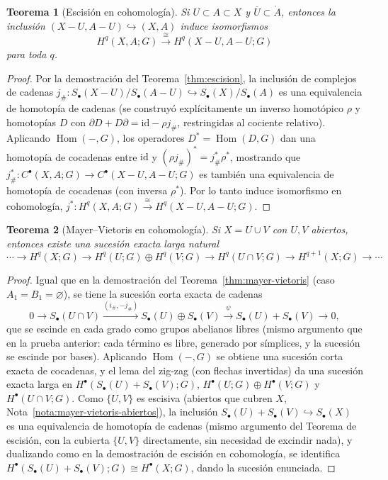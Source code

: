 \documentclass[11pt,a4paper]{article}
\theoremstyle{plain}
\newtheorem{theorem}{Teorema}[section]
\theoremstyle{definition}
\theoremstyle{remark}
\DeclareMathOperator{\Hom}{Hom}
\begin{document}
\begin{theorem}[Escisión en cohomología]
\label{thm:escision-cohomologia}
Si $U\subset A\subset X$ y $\overline U\subset\mathring A$, entonces la
inclusión $(X-U,A-U)\hookrightarrow(X,A)$ induce isomorfismos
\[
H^q(X,A;G)\xrightarrow{\cong}H^q(X-U,A-U;G)
\]
para toda $q$.
\end{theorem}

\begin{proof}
Por la demostración del Teorema~\ref{thm:escision}, la inclusión de
complejos de cadenas $j_\#:S_\bullet(X-U)/S_\bullet(A-U)\hookrightarrow S_\bullet(X)/S_\bullet(A)$
es una equivalencia de homotopía de cadenas (se construyó explícitamente
un inverso homotópico $\rho$ y homotopías $D$ con
$\partial D+D\partial=\mathrm{id}-\rho j_\#$, restringidas al cociente
relativo). Aplicando $\Hom(-,G)$, los operadores $D^*=\Hom(D,G)$ dan una
homotopía de cocadenas entre $\mathrm{id}$ y $(\rho j_\#)^*=j_\#^*\rho^*$,
mostrando que $j_\#^*:C^\bullet(X,A;G)\to C^\bullet(X-U,A-U;G)$ es
también una equivalencia de homotopía de cocadenas (con inversa
$\rho^*$). Por lo tanto induce isomorfismo en cohomología,
$j^*:H^q(X,A;G)\xrightarrow{\cong}H^q(X-U,A-U;G)$.
\end{proof}

\begin{theorem}[Mayer--Vietoris en cohomología]
\label{thm:mayer-vietoris-cohomologia}
Si $X=U\cup V$ con $U,V$ abiertos, entonces existe una sucesión exacta
larga natural
\[
\cdots\to H^q(X;G)\to H^q(U;G)\oplus H^q(V;G)\to H^q(U\cap V;G)\to H^{q+1}(X;G)\to\cdots
\]
\end{theorem}

\begin{proof}
Igual que en la demostración del Teorema~\ref{thm:mayer-vietoris} (caso
$A_1=B_1=\varnothing$), se tiene la sucesión corta exacta de cadenas
\[
0\to S_\bullet(U\cap V)\xrightarrow{(i_\#,-j_\#)}S_\bullet(U)\oplus S_\bullet(V)\xrightarrow{\psi}S_\bullet(U)+S_\bullet(V)\to0,
\]
que se escinde en cada grado como grupos abelianos libres (mismo
argumento que en la prueba anterior: cada término es libre, generado por
símplices, y la sucesión se escinde por bases). Aplicando $\Hom(-,G)$ se
obtiene una sucesión corta exacta de cocadenas, y el lema del zig-zag
(con flechas invertidas) da una sucesión exacta larga en
$H^\bullet(S_\bullet(U)+S_\bullet(V);G)$, $H^\bullet(U;G)\oplus H^\bullet(V;G)$
y $H^\bullet(U\cap V;G)$. Como $\{U,V\}$ es escisiva (abiertos que cubren
$X$, Nota~\ref{nota:mayer-vietoris-abiertos}), la inclusión
$S_\bullet(U)+S_\bullet(V)\hookrightarrow S_\bullet(X)$ es una
equivalencia de homotopía de cadenas (mismo argumento del Teorema de
escisión, con la cubierta $\{U,V\}$ directamente, sin necesidad de
excindir nada), y dualizando como en la demostración de
escisión en cohomología, se identifica
$H^\bullet(S_\bullet(U)+S_\bullet(V);G)\cong H^\bullet(X;G)$, dando la
sucesión enunciada.
\end{proof}
\end{document}
